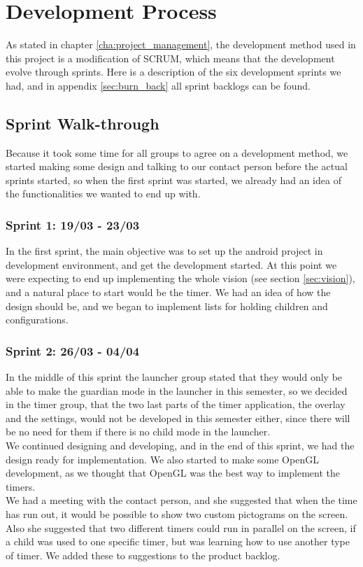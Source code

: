 \chapter{Development Process}
As stated in chapter \ref{cha:project_management}, the development method used in this project is a modification of SCRUM, which means that the development evolve through sprints. Here is a description of the six development sprints we had, and in appendix \ref{sec:burn_back} all sprint backlogs can be found.

\section{Sprint Walk-through}
Because it took some time for all groups to agree on a development method, we started making some design and talking to our contact person before the actual sprints started, so when the first sprint was started, we already had an idea of the functionalities we wanted to end up with.

\subsection*{Sprint 1: 19/03 - 23/03}
In the first sprint, the main objective was to set up the android project in development environment, and get the development started. At this point we were expecting to end up implementing the whole vision (see section \ref{sec:vision}), and a natural place to start would be the timer. We had an idea of how the design should be, and we began to implement lists for holding children and configurations.

\subsection*{Sprint 2: 26/03 - 04/04}
In the middle of this sprint the launcher group stated that they would only be able to make the guardian mode in the launcher in this semester, so we decided in the timer group, that the two last parts of the timer application, the overlay and the settings, would not be developed in this semester either, since there will be no need for them if there is no child mode in the launcher.\\
	We continued designing and developing, and in the end of this sprint, we had the design ready for implementation. We also started to make some OpenGL development, as we thought that OpenGL was the best way to implement the timers.\\
	We had a meeting with the contact person, and she suggested that when the time has run out, it would be possible to show two custom pictograms on the screen. Also she suggested that two different timers could run in parallel on the screen, if a child was used to one specific timer, but was learning how to use another type of timer. We added these to suggestions to the product backlog.

